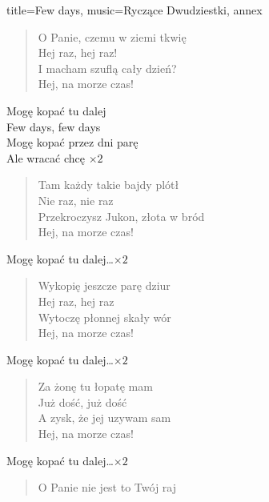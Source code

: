 \newpage
\begin{song}{title={Few days}, music={Ryczące Dwudziestki}, annex}
\begin{multicols}{2}
    \begin{verse}
        O Panie, czemu w ziemi tkwię \\
        Hej raz, hej raz! \\
        I macham szuflą cały dzień? \\
        Hej, na morze czas!
    \end{verse}
    \begin{chorus}
        Mogę kopać tu dalej \\
        Few days, few days \\
        Mogę kopać przez dni parę \\
        Ale wracać chcę $\times 2$
    \end{chorus}
    \begin{verse}
        Tam każdy takie bajdy plótł \\
        Nie raz, nie raz \\
        Przekroczysz Jukon, złota w bród \\
        Hej, na morze czas!
    \end{verse}
    \begin{chorus}
        Mogę kopać tu dalej\ldots $\times 2$ 
    \end{chorus}
    \vfill\null\columnbreak{}
    \begin{verse}
        Wykopię jeszcze parę dziur \\
        Hej raz, hej raz \\
        Wytoczę płonnej skały wór \\
        Hej, na morze czas!
    \end{verse}
    \begin{chorus}
        Mogę kopać tu dalej\ldots $\times 2$ 
    \end{chorus}
    \begin{verse}
        Za żonę tu łopatę mam \\
        Już dość, już dość \\
        A zysk, że jej uzywam sam \\
        Hej, na morze czas!
    \end{verse}
    \begin{chorus}
        Mogę kopać tu dalej\ldots $\times 2$
    \end{chorus}
    \begin{verse}
        O Panie nie jest to Twój raj \\

\end{verse}
\end{multicols}
\end{song}
